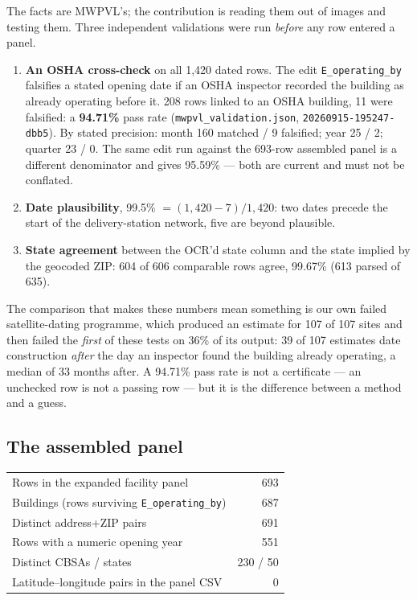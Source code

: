 \documentclass[conference]{IEEEtran}
\begin{document}
The facts are MWPVL's; the contribution is reading them out of images and
testing them. Three independent validations were run \emph{before} any row
entered a panel.

\begin{enumerate}
\item \textbf{An OSHA cross-check} on all 1{,}420 dated rows. The edit
\texttt{E\_operating\_by} falsifies a stated opening date if an OSHA inspector
recorded the building as already operating before it. 208 rows linked to an
OSHA building, 11 were falsified: a \textbf{94.71\%} pass rate
(\texttt{mwpvl\_validation.json}, \texttt{20260915-195247-dbb5}). By stated
precision: month 160 matched / 9 falsified; year 25 / 2; quarter 23 / 0. The
same edit run against the 693-row assembled panel is a different denominator
and gives 95.59\% --- both are current and must not be conflated.

\item \textbf{Date plausibility}, 99.5\% $= (1{,}420 - 7)/1{,}420$: two dates
precede the start of the delivery-station network, five are beyond plausible.

\item \textbf{State agreement} between the OCR'd state column and the state
implied by the geocoded ZIP: 604 of 606 comparable rows agree, 99.67\%
(613 parsed of 635).
\end{enumerate}

The comparison that makes these numbers mean something is our own failed
satellite-dating programme, which produced an estimate for 107 of 107 sites
and then failed the \emph{first} of these tests on 36\% of its output: 39 of
107 estimates date construction \emph{after} the day an inspector found the
building already operating, a median of 33 months after. A 94.71\% pass rate
is not a certificate --- an unchecked row is not a passing row --- but it is
the difference between a method and a guess.

\subsection{The assembled panel}

\begin{center}
\begin{tabular}{lr}
\hline
Rows in the expanded facility panel & 693 \\
Buildings (rows surviving \texttt{E\_operating\_by}) & 687 \\
Distinct address+ZIP pairs & 691 \\
Rows with a numeric opening year & 551 \\
Distinct CBSAs / states & 230 / 50 \\
Latitude--longitude pairs in the panel CSV & 0 \\
\hline
\end{tabular}
\end{center}
\end{document}
